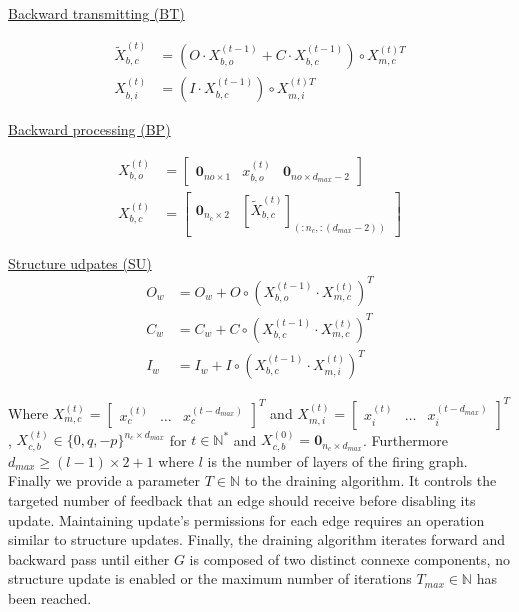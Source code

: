 \documentclass[a4paper, 11pt]{article}
\begin{document}
\vspace{20px}\noindent\begin{minipage}{.5\linewidth}
\begin{center}
\underline{Backward transmitting (BT)}
\end{center}
\begin{align*}
\tilde{X}_{b, c}^{(t)} &= (O \cdot X_{b, o}^{(t-1)} + C \cdot X_{b, c}^{(t-1)}) \circ X_{m, c}^{(t)T}\\
X_{b,i}^{(t)} &= (I \cdot X_{b, c}^{(t-1)}) \circ X_{m, i}^{(t)T}
\end{align*} 
\end{minipage}%
\noindent\begin{minipage}{.5\linewidth}
\begin{center}
\underline{Backward processing (BP)}
\end{center}
\begin{align*}
X_{b, o}^{(t)} &= \begin{bmatrix} \textbf{0}_{no \times 1} & x_{b, o}^{(t)} & \textbf{0}_{no \times d_{max} - 2} \end{bmatrix} \\
X_{b, c}^{(t)} &= \begin{bmatrix} \textbf{0}_{n_c \times 2} & [\tilde{X}_{b, c}^{(t)}]_{(:n_c, :(d_{max}-2))} \end{bmatrix} 
\end{align*}
\end{minipage}

\begin{center}
\underline{Structure udpates (SU)}
\begin{align*}
O_w &= O_w + O \circ (X_{b, o}^{(t-1)} \cdot X_{m, c}^{(t)})^{T}\\
C_w &= C_w + C \circ (X_{b, c}^{(t-1)} \cdot X_{m, c}^{(t)})^{T}\\
I_w &= I_w + I \circ (X_{b, c}^{(t-1)} \cdot X_{m, i}^{(t)})^{T}
\end{align*}
\end{center}\vspace{20px}


 
Where $X_{m,c}^{(t)} = \begin{bmatrix} x_c^{(t)} & \ldots & x_c^{(t- d_{max})}\end{bmatrix}^{T}$ and $X_{m, i}^{(t)} =\begin{bmatrix} x_i^{(t)} & \ldots & x_i^{(t- d_{max})}\end{bmatrix}^{T}$, $X_{c, b}^{(t)} \in  \{0, q, - p \}^{n_c \times d_{max}}$ for $t \in \mathbb{N}^{*}$ and $X_{c, b}^{(0)} = \textbf{0}_{n_c \times d_{max}}$. Furthermore $d_{max} \geq (l -1) \times 2 + 1$ where $l$ is the number of layers of the firing graph. Finally we provide a parameter $T \in \mathbb{N}$ to the draining algorithm. It controls the targeted number of feedback that an edge should receive before disabling its update. Maintaining update's permissions for each edge requires an operation similar to structure updates. Finally, the draining algorithm iterates forward and backward pass until either $G$ is composed of two distinct connexe components, no structure update is enabled or the maximum number of iterations $T_{max} \in \mathbb{N}$ has been reached. 
\end{document}
